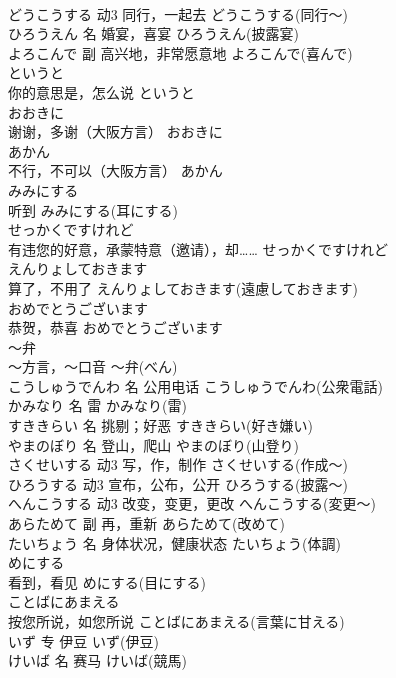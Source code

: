 \documentclass[8pt]{extreport}
\begin{document}
\begin{CJK}{UTF8}{min}
\\	どうこうする	动3	同行，一起去	どうこうする(同行～)	
\\	ひろうえん	名	婚宴，喜宴	ひろうえん(披露宴)	
\\	よろこんで	副	高兴地，非常愿意地	よろこんで(喜んで)	
\\	というと	
\\	你的意思是，怎么说	というと	
\\	おおきに	
\\	谢谢，多谢（大阪方言）	おおきに	
\\	あかん	
\\	不行，不可以（大阪方言）	あかん	
\\	みみにする	
\\	听到	みみにする(耳にする)	
\\	せっかくですけれど	
\\	有违您的好意，承蒙特意（邀请），却……	せっかくですけれど	
\\	えんりょしておきます	
\\	算了，不用了	えんりょしておきます(遠慮しておきます)	
\\	おめでとうございます	
\\	恭贺，恭喜	おめでとうございます	
\\	～弁	
\\	～方言，～口音	～弁(べん)	
\\	こうしゅうでんわ	名	公用电话	こうしゅうでんわ(公衆電話)	
\\	かみなり	名	雷	かみなり(雷)	
\\	すききらい	名	挑剔；好恶	すききらい(好き嫌い)	
\\	やまのぼり	名	登山，爬山	やまのぼり(山登り)	
\\	さくせいする	动3	写，作，制作	さくせいする(作成～)	
\\	ひろうする	动3	宣布，公布，公开	ひろうする(披露～)	
\\	へんこうする	动3	改变，变更，更改	へんこうする(変更～)	
\\	あらためて	副	再，重新	あらためて(改めて)	
\\	たいちょう	名	身体状况，健康状态	たいちょう(体調)	
\\	めにする	
\\	看到，看见	めにする(目にする)	
\\	ことばにあまえる	
\\	按您所说，如您所说	ことばにあまえる(言葉に甘える)	
\\	いず	专	伊豆	いず(伊豆)	
\\	けいば	名	赛马	けいば(競馬)	

\end{CJK}
\end{document}

